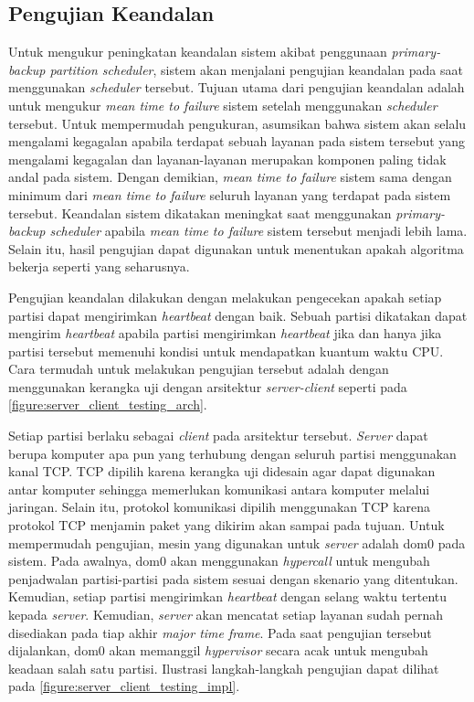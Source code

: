 \subsection{Pengujian Keandalan}
\label{section:pengujian_keandalan}
Untuk mengukur peningkatan keandalan sistem akibat penggunaan \textit{primary-backup partition
scheduler}, sistem akan menjalani pengujian keandalan pada saat menggunakan \textit{scheduler}
tersebut.  Tujuan utama dari pengujian keandalan adalah untuk mengukur \textit{mean time to
failure} sistem setelah menggunakan \textit{scheduler} tersebut. Untuk mempermudah pengukuran,
asumsikan bahwa sistem akan selalu mengalami kegagalan apabila terdapat sebuah layanan pada
sistem tersebut yang mengalami kegagalan dan layanan-layanan merupakan komponen paling tidak
andal pada sistem. Dengan demikian, \textit{mean time to failure} sistem sama dengan minimum
dari \textit{mean time to failure} seluruh layanan yang terdapat pada sistem tersebut. Keandalan
sistem dikatakan meningkat saat menggunakan \textit{primary-backup scheduler} apabila
\textit{mean time to failure} sistem tersebut menjadi lebih lama. Selain itu, hasil pengujian
dapat digunakan untuk menentukan apakah algoritma bekerja seperti yang seharusnya.

Pengujian keandalan dilakukan dengan melakukan pengecekan apakah setiap partisi dapat
mengirimkan \textit{heartbeat} dengan baik. Sebuah partisi dikatakan dapat mengirim
\textit{heartbeat} apabila partisi mengirimkan \textit{heartbeat} jika dan hanya jika partisi
tersebut memenuhi kondisi untuk mendapatkan kuantum waktu CPU. Cara termudah untuk melakukan
pengujian tersebut adalah dengan menggunakan kerangka uji dengan arsitektur
\textit{server-client} seperti pada \autoref{figure:server_client_testing_arch}.

Setiap partisi berlaku sebagai \textit{client} pada arsitektur tersebut. \textit{Server} dapat
berupa komputer apa pun yang terhubung dengan seluruh partisi menggunakan kanal TCP. TCP dipilih
karena kerangka uji didesain agar dapat digunakan antar komputer sehingga memerlukan komunikasi
antara komputer melalui jaringan. Selain itu, protokol komunikasi dipilih menggunakan TCP karena
protokol TCP menjamin paket yang dikirim akan sampai pada tujuan. Untuk mempermudah pengujian,
mesin yang digunakan untuk \textit{server} adalah dom0 pada sistem. Pada awalnya, dom0 akan
menggunakan \textit{hypercall} untuk mengubah penjadwalan partisi-partisi pada sistem sesuai
dengan skenario yang ditentukan.  Kemudian, setiap partisi mengirimkan \textit{heartbeat} dengan
selang waktu tertentu kepada \textit{server}.  Kemudian, \textit{server} akan mencatat setiap
layanan sudah pernah disediakan pada tiap akhir \textit{major time frame}. Pada saat pengujian
tersebut dijalankan, dom0 akan memanggil \textit{hypervisor} secara acak untuk mengubah keadaan
salah satu partisi. Ilustrasi langkah-langkah pengujian dapat dilihat pada
\autoref{figure:server_client_testing_impl}.

